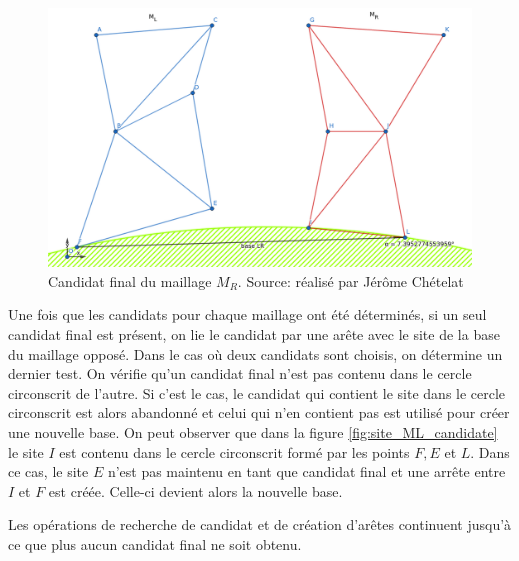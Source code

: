 \begin{figure}[htpb!]
    \centering
    \includegraphics[width=0.8\linewidth]{figures/site_MR.png}
    \caption{Candidat final du maillage $M_R$. Source: réalisé par Jérôme Chételat}
    \label{fig:site_MR_candidate}
\end{figure}

Une fois que les candidats pour chaque maillage ont été déterminés, si un seul candidat final est présent, on lie le candidat par une arête avec le site de la base du maillage opposé. Dans le cas où deux candidats sont choisis, on détermine un dernier test. On vérifie qu'un candidat final n'est pas contenu dans le cercle circonscrit de l'autre. Si c'est le cas, le candidat qui contient le site dans le cercle circonscrit est alors abandonné et celui qui n'en contient pas est utilisé pour créer une nouvelle base. On peut observer que dans la figure \ref{fig:site_ML_candidate} le site $I$ est contenu dans le cercle circonscrit formé par les points $F, E$ et $L$. Dans ce cas, le site $E$ n'est pas maintenu en tant que candidat final et une arrête entre $I$ et $F$ est créée. Celle-ci devient alors la nouvelle base.

Les opérations de recherche de candidat et de création d'arêtes continuent jusqu'à ce que plus aucun candidat final ne soit obtenu.
